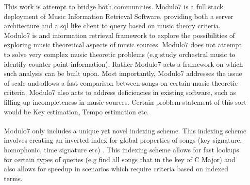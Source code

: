 This work is attempt to bridge both communities. Modulo7 is a full stack deployment of Music Information Retrieval Software, providing both a server architecture and a sql like client to query based on music theory criteria. Modulo7 is and information retrieval framework to explore the possibilities of exploring music theoretical aspects of music sources. Modulo7 does not attempt to solve very complex music theoretic problems (e.g study orchestral music to identify counter point information). Rather Modulo7 acts a framework on which such analysis can be built upon. Most importantly, Modulo7 addresses the issue of scale and allows a fast comparison between songs on certain music theoretic criteria. Modulo7 also acts to address deficiencies in existing software, such as filling up incompleteness in music sources. Certain problem statement of this sort would be Key estimation, Tempo estimation etc. \\\\
Modulo7 only includes a unique yet novel indexing scheme. This indexing scheme involves creating an inverted index for global properties of songs (key signature, homophonic, time signature etc) . This indexing scheme allows for fast lookups for certain types of queries (e.g find all songs that in the key of C Major) and also allows for speedup in scenarios which require criteria based on indexed terms. 